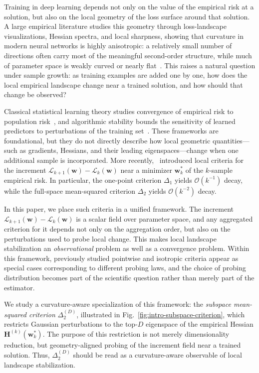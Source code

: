 \documentclass[10pt]{article}
\theoremstyle{plain}
\theoremstyle{remark}
\begin{document}
Training in deep learning depends not only on the value of the empirical risk at a solution, but also on the local geometry of the loss surface around that solution.
A large empirical literature studies this geometry through loss-landscape visualizations, Hessian spectra, and local sharpness, showing that curvature in modern neural networks is highly anisotropic: a relatively small number of directions often carry most of the meaningful second-order structure, while much of parameter space is weakly curved or nearly flat~\citep{li2018visualizing,sagun2017hessian,ghorbani2019investigation,papyan2019fullspectrum,xu2024mining}.
This raises a natural question under sample growth: as training examples are added one by one, how does the local empirical landscape change near a trained solution, and how should that change be observed?

Classical statistical learning theory studies convergence of empirical risk to population risk~\citep{vapnik1998statistical,shalev2014understanding}, and algorithmic stability bounds the sensitivity of learned predictors to perturbations of the training set~\citep{bousquet2002stability,feldman2019high,bousquet2020sharper}.
These frameworks are foundational, but they do not directly describe how local geometric quantities---such as gradients, Hessians, and their leading eigenspaces---change when one additional sample is incorporated.
More recently,~\citet{author:delta1,author:delta2} introduced local criteria for the increment $\mathcal L_{k+1}(\mathbf w)-\mathcal L_k(\mathbf w)$ near a minimizer $\mathbf w_k^*$ of the $k$-sample empirical risk.
In particular, the one-point criterion $\Delta_1$ yields $\mathcal O(k^{-1})$ decay, while the full-space mean-squared criterion $\Delta_2$ yields $\mathcal O(k^{-2})$ decay.

In this paper, we place such criteria in a unified framework.
The increment $\mathcal L_{k+1}(\mathbf w)-\mathcal L_k(\mathbf w)$ is a scalar field over parameter space, and any aggregated criterion for it depends not only on the aggregation order, but also on the perturbations used to probe local change.
This makes local landscape stabilization an \emph{observational} problem as well as a convergence problem.
Within this framework, previously studied pointwise and isotropic criteria appear as special cases corresponding to different probing laws, and the choice of probing distribution becomes part of the scientific question rather than merely part of the estimator.

We study a curvature-aware specialization of this framework: the \emph{subspace mean-squared criterion} $\Delta_2^{(D)}$, illustrated in Fig.~\ref{fig:intro-subspace-criterion}, which restricts Gaussian perturbations to the top-$D$ eigenspace of the empirical Hessian $\mathbf H^{(k)}(\mathbf w_k^*)$.
The purpose of this restriction is not merely dimensionality reduction, but geometry-aligned probing of the increment field near a trained solution.
Thus, $\Delta_2^{(D)}$ should be read as a curvature-aware observable of local landscape stabilization.
\end{document}

